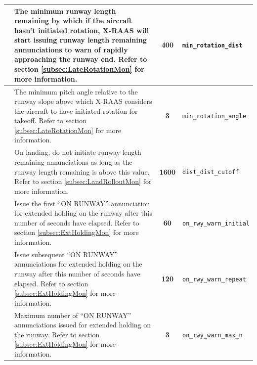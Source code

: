\documentclass[a4paper,12pt]{article}
\newcommand{\confopt}[1]{\texttt{#1}}
\begin{document}
{\begin{center}
\begin{supertabular}{|c|p{8cm}|c|l|}
 &
The minimum runway length remaining by which if the aircraft hasn't
initiated rotation, X-RAAS will start issuing runway length remaining
annunciations to warn of rapidly approaching the runway end.\newline
Refer to section \ref{subsec:LateRotationMon} for more information. &
\textbf{400} & \confopt{min\_rotation\_dist} \\

\hline

 &
The minimum pitch angle relative to the runway slope above which X-RAAS
considers the aircraft to have initiated rotation for takeoff.\newline
Refer to section \ref{subsec:LateRotationMon} for more information. &
\textbf{3} & \confopt{min\_rotation\_angle} \\

\hline

 &
On landing, do not initiate runway length remaining annunciations as long
as the runway length remaining is above this value.\newline
Refer to section \ref{subsec:LandRolloutMon} for more information. &
\textbf{1600} & \confopt{dist\_dist\_cutoff} \\

\hline

 &
Issue the first ``ON RUNWAY'' annunciation for extended holding on the
runway after this number of seconds have elapsed.\newline
Refer to section \ref{subsec:ExtHoldingMon} for more information. &
\textbf{60} & \confopt{on\_rwy\_warn\_initial} \\

\hline

 &
Issue subsequent ``ON RUNWAY'' annunciations for extended holding on the
runway after this number of seconds have elapsed.\newline
Refer to section \ref{subsec:ExtHoldingMon} for more information. &
\textbf{120} & \confopt{on\_rwy\_warn\_repeat} \\

\hline

 &
Maximum number of ``ON RUNWAY'' annunciations issued for extended holding
on the runway.
Refer to section \ref{subsec:ExtHoldingMon} for more information. &
\textbf{3} & \confopt{on\_rwy\_warn\_max\_n} \\

\hline


\end{supertabular}
\end{center}}
\end{document}
